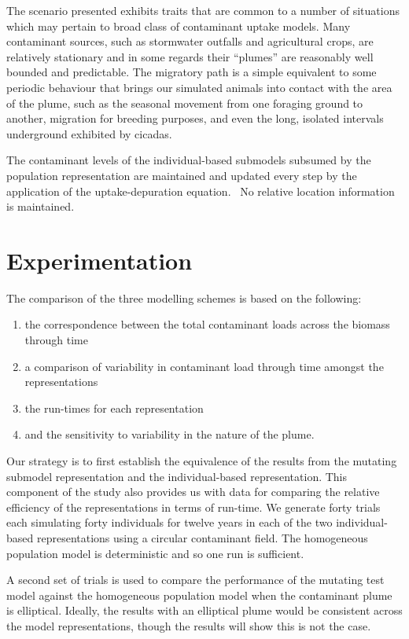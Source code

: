 \documentclass[preprint,authoryear,5p,twocolumn]{elsarticle}
\begin{document}
The scenario presented exhibits traits that are common to a number of situations which may pertain to broad class of
contaminant uptake models. Many contaminant sources, such as stormwater outfalls and agricultural crops, are relatively
stationary and in some regards their ``plumes'' are reasonably well bounded and predictable. The migratory path is a
simple equivalent to some periodic behaviour that brings our simulated animals into contact with the area of the plume,
such as the seasonal movement from one foraging ground to another, migration for breeding purposes, and even the long,
isolated intervals underground exhibited by cicadas.

The contaminant levels of the individual-based submodels subsumed by the population representation are maintained and
updated every step by the application of the uptake-depuration equation. \ No relative location information is
maintained.

\section{Experimentation}

The comparison of the three modelling schemes is based on the following:
\begin{enumerate}
  \item the correspondence between the total contaminant loads across the biomass through time
  
  \item a comparison of variability in contaminant load through time amongst the representations
  
  \item the run-times for each representation
  
  \item and the sensitivity to variability in the nature of the plume.
\end{enumerate}


Our strategy is to first establish the equivalence of the results from the mutating submodel representation and the
individual-based representation. This component of the study also provides us with data for comparing the relative
efficiency of the representations in terms of run-time. We generate forty trials each simulating forty individuals for
twelve years in each of the two individual-based representations using a circular contaminant field. The homogeneous
population model is deterministic and so one run is sufficient.

A second set of trials is used to compare the performance of the mutating test model against the homogeneous population
model when the contaminant plume is elliptical. Ideally, the results with an elliptical plume would be consistent
across the model representations, though the results will show this is not the case.
\end{document}
